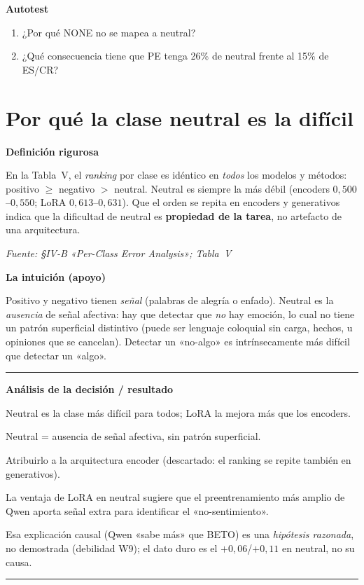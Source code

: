 \documentclass[11pt,a4paper]{article}
\newcommand{\nivel}[1]{\medskip\noindent\textbf{\textcolor{blue!45!black}{#1}}\par\nopagebreak\smallskip}
\newcommand{\fuente}[1]{\nopagebreak\par\hfill{\footnotesize\textit{Fuente: #1}}\par}
\newenvironment{analisis}{%
  \medskip\par\noindent\rule{\linewidth}{0.4pt}\par\nopagebreak
  \textbf{Análisis de la decisión / resultado}\par\nopagebreak\smallskip
  \begin{description}[leftmargin=2.6cm,style=nextline,font=\bfseries]
}{%
  \end{description}\noindent\rule{\linewidth}{0.4pt}\par\medskip
}
\begin{document}
\nivel{Autotest}
\begin{enumerate}[nosep]
  \item ¿Por qué NONE no se mapea a neutral?
  \item ¿Qué consecuencia tiene que PE tenga 26\% de neutral frente al 15\% de ES/CR?
\end{enumerate}

\section{Por qué la clase neutral es la difícil}\label{sec:neutral}

\nivel{Definición rigurosa}
En la Tabla~V, el \emph{ranking} por clase es idéntico en \emph{todos} los modelos y métodos:
positivo $\geq$ negativo $>$ neutral. Neutral es siempre la más débil (encoders $0{,}500$--$0{,}550$;
LoRA $0{,}613$--$0{,}631$). Que el orden se repita en encoders y generativos indica que la dificultad
de neutral es \textbf{propiedad de la tarea}, no artefacto de una arquitectura.
\fuente{\S IV-B «Per-Class Error Analysis»; Tabla~V}

\nivel{La intuición (apoyo)}
Positivo y negativo tienen \emph{señal} (palabras de alegría o enfado). Neutral es la \emph{ausencia}
de señal afectiva: hay que detectar que \emph{no} hay emoción, lo cual no tiene un patrón superficial
distintivo (puede ser lenguaje coloquial sin carga, hechos, u opiniones que se cancelan). Detectar un
«no-algo» es intrínsecamente más difícil que detectar un «algo».

\begin{analisis}
  \item[Qué] Neutral es la clase más difícil para todos; LoRA la mejora más que los encoders.
  \item[Por qué] Neutral = ausencia de señal afectiva, sin patrón superficial.
  \item[Alternativas descartadas] Atribuirlo a la arquitectura encoder (descartado: el ranking se
        repite también en generativos).
  \item[Qué significa] La ventaja de LoRA en neutral sugiere que el preentrenamiento más amplio de
        Qwen aporta señal extra para identificar el «no-sentimiento».
  \item[Qué NO significa] Esa explicación causal (Qwen «sabe más» que BETO) es una \emph{hipótesis
        razonada}, no demostrada (debilidad W9); el dato duro es el $+0{,}06$/$+0{,}11$ en neutral,
        no su causa.
\end{analisis}
\end{document}
